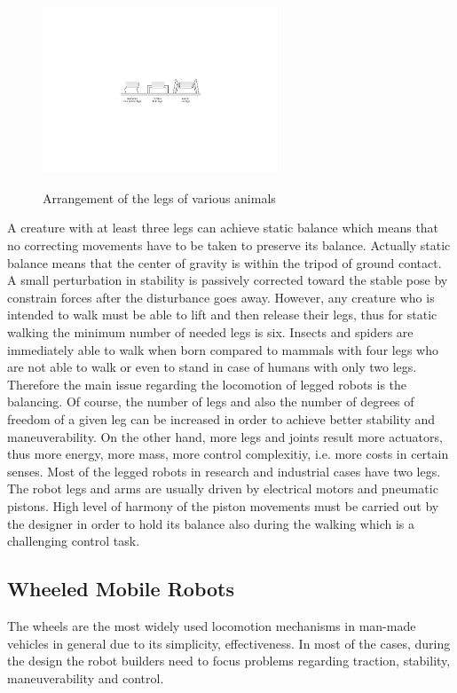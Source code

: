 \documentclass[12pt,english,twoside]{article}
\begin{document}
\begin{figure}[h]
	\centering
	\includegraphics[width=7cm]{figures/legged2.pdf}
	\label{legged}
	\caption{Arrangement of the legs of various animals \cite{sieg}}
\end{figure}

A creature with at least three legs can achieve static balance which means that no correcting movements have to be taken to preserve its balance. Actually static balance means that the center of gravity is within the tripod of ground contact. A small perturbation in stability is passively corrected toward the stable pose by constrain forces after the disturbance goes away. However, any creature who is intended to walk must be able to lift and then release their legs, thus for static walking the minimum number of needed legs is six. Insects and spiders are immediately able to walk when born compared to mammals with four legs who are not able to walk or even to stand in case of humans with only two legs. Therefore the main issue regarding the locomotion of legged robots is the balancing. Of course, the number of legs and also the number of degrees of freedom of a given leg can be increased in order to achieve better stability and maneuverability. On the other hand, more legs and joints result more actuators, thus more energy, more mass, more control complexitiy, i.e. more costs in certain senses. Most of the legged robots in research and industrial cases have two legs.
The robot legs and arms are usually driven by electrical motors and pneumatic pistons. High level of harmony of the piston movements must be carried out by the designer in order to hold its balance also during the walking which is a challenging control task. \cite{sieg}

\subsection{Wheeled Mobile Robots}
The wheels are the most widely used locomotion mechanisms in man-made vehicles in general due to its simplicity, effectiveness. In most of the cases, during the design the robot builders need to focus problems regarding traction, stability, maneuverability and control. 
\end{document}
